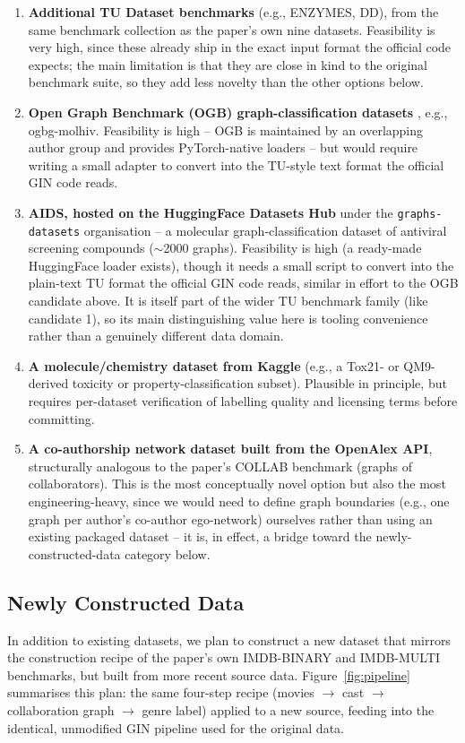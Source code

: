 \documentclass[11pt]{article}
\begin{document}
\begin{enumerate}
    \item \textbf{Additional TU Dataset benchmarks} (e.g., ENZYMES, DD), from the same benchmark collection as the paper's own nine datasets. Feasibility is very high, since these already ship in the exact input format the official code expects; the main limitation is that they are close in kind to the original benchmark suite, so they add less novelty than the other options below.
    \item \textbf{Open Graph Benchmark (OGB) graph-classification datasets} \citep{hu2020ogb}, e.g., ogbg-molhiv. Feasibility is high -- OGB is maintained by an overlapping author group and provides PyTorch-native loaders -- but would require writing a small adapter to convert into the TU-style text format the official GIN code reads.
    \item \textbf{AIDS, hosted on the HuggingFace Datasets Hub} under the \texttt{graphs-datasets} organisation -- a molecular graph-classification dataset of antiviral screening compounds ($\sim$2000 graphs). Feasibility is high (a ready-made HuggingFace loader exists), though it needs a small script to convert into the plain-text TU format the official GIN code reads, similar in effort to the OGB candidate above. It is itself part of the wider TU benchmark family (like candidate 1), so its main distinguishing value here is tooling convenience rather than a genuinely different data domain.
    \item \textbf{A molecule/chemistry dataset from Kaggle} (e.g., a Tox21- or QM9-derived toxicity or property-classification subset). Plausible in principle, but requires per-dataset verification of labelling quality and licensing terms before committing.
    \item \textbf{A co-authorship network dataset built from the OpenAlex API}, structurally analogous to the paper's COLLAB benchmark (graphs of collaborators). This is the most conceptually novel option but also the most engineering-heavy, since we would need to define graph boundaries (e.g., one graph per author's co-author ego-network) ourselves rather than using an existing packaged dataset -- it is, in effect, a bridge toward the newly-constructed-data category below.
\end{enumerate}

\subsection{Newly Constructed Data}
\label{sec:newdata2}
In addition to existing datasets, we plan to construct a new dataset that mirrors the construction recipe of the paper's own IMDB-BINARY and IMDB-MULTI benchmarks, but built from more recent source data. Figure~\ref{fig:pipeline} summarises this plan: the same four-step recipe (movies $\rightarrow$ cast $\rightarrow$ collaboration graph $\rightarrow$ genre label) applied to a new source, feeding into the identical, unmodified GIN pipeline used for the original data.
\end{document}
